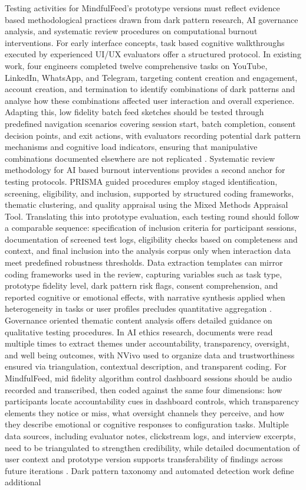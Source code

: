\documentclass{article}
\begin{document}
\label{sec:testing_protocols_prototypes} Testing activities for MindfulFeed's prototype versions must reflect evidence based methodological practices drawn from dark pattern research, AI governance analysis, and systematic review procedures on computational burnout interventions. For early interface concepts, task based cognitive walkthroughs executed by experienced UI/UX evaluators offer a structured protocol. In existing work, four engineers completed twelve comprehensive tasks on YouTube, LinkedIn, WhatsApp, and Telegram, targeting content creation and engagement, account creation, and termination to identify combinations of dark patterns and analyse how these combinations affected user interaction and overall experience. Adapting this, low fidelity batch feed sketches should be tested through predefined navigation scenarios covering session start, batch completion, consent decision points, and exit actions, with evaluators recording potential dark pattern mechanisms and cognitive load indicators, ensuring that manipulative combinations documented elsewhere are not replicated \parencites[3]{4692551}. Systematic review methodology for AI based burnout interventions provides a second anchor for testing protocols. PRISMA guided procedures employ staged identification, screening, eligibility, and inclusion, supported by structured coding frameworks, thematic clustering, and quality appraisal using the Mixed Methods Appraisal Tool. Translating this into prototype evaluation, each testing round should follow a comparable sequence: specification of inclusion criteria for participant sessions, documentation of screened test logs, eligibility checks based on completeness and context, and final inclusion into the analysis corpus only when interaction data meet predefined robustness thresholds. Data extraction templates can mirror coding frameworks used in the review, capturing variables such as task type, prototype fidelity level, dark pattern risk flags, consent comprehension, and reported cognitive or emotional effects, with narrative synthesis applied when heterogeneity in tasks or user profiles precludes quantitative aggregation \parencites[19]{8760542}. Governance oriented thematic content analysis offers detailed guidance on qualitative testing procedures. In AI ethics research, documents were read multiple times to extract themes under accountability, transparency, oversight, and well being outcomes, with NVivo used to organize data and trustworthiness ensured via triangulation, contextual description, and transparent coding. For MindfulFeed, mid fidelity algorithm control dashboard sessions should be audio recorded and transcribed, then coded against the same four dimensions: how participants locate accountability cues in dashboard controls, which transparency elements they notice or miss, what oversight channels they perceive, and how they describe emotional or cognitive responses to configuration tasks. Multiple data sources, including evaluator notes, clickstream logs, and interview excerpts, need to be triangulated to strengthen credibility, while detailed documentation of user context and prototype version supports transferability of findings across future iterations \parencites[8]{7808872}. Dark pattern taxonomy and automated detection work define additional 
\end{document}
